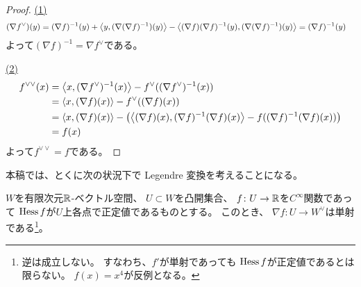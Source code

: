 \documentclass[report]{jlreq}
\begin{document}
\begin{proof}
    \uline{(1)} \quad
    \begin{alignat}{1}
        (\nabla f^\vee)(y)
            &=
                (\nabla f)^{-1}(y)
                + \left\langle{
                    y
                },{
                    (\nabla
                        (\nabla f)^{-1}
                    )(y)
                }\right\rangle
                - \left\langle{
                    (\nabla f)
                    (\nabla f)^{-1}
                    (y)
                },{
                    (\nabla
                        (\nabla f)^{-1}
                    )(y)
                }\right\rangle
            =
                (\nabla f)^{-1}(y)
    \end{alignat}
    よって$(\nabla f)^{-1} = \nabla f^\vee$である。

    \uline{(2)} \quad
    \begin{alignat}{1}
        f^{\vee\vee}(x)
            &=
                \left\langle{
                    x
                },{
                    (\nabla f^\vee)^{-1}
                    (x)
                }\right\rangle
                - f^\vee(
                    (\nabla f^\vee)^{-1}
                    (x)
                )
                \\
            &=
                \left\langle{
                    x
                },{
                    (\nabla f)
                    (x)
                }\right\rangle
                - f^\vee(
                    (\nabla f)
                    (x)
                )
                \\
            &=
                \left\langle{
                    x
                },{
                    (\nabla f)
                    (x)
                }\right\rangle
                - \left({
                    \left\langle{
                        (\nabla f)
                        (x)
                    },{
                        (\nabla f)^{-1}
                        (\nabla f)
                        (x)
                    }\right\rangle
                    - f(
                        (\nabla f)^{-1}
                        (\nabla f)
                        (x)
                    )
                }\right)
                \\
            &=
                f(x)
    \end{alignat}
    よって$f^{\vee\vee} = f$である。
\end{proof}

本稿では、とくに次の状況下で Legendre 変換を考えることになる。

\begin{lemma}
    $W$を有限次元$\mathbb{R}$-ベクトル空間、
    $U \subset W$を凸開集合、
    $f \colon U \to \mathbb{R}$を$C^\infty$関数であって
    $\operatorname{Hess} f$が$U$上各点で正定値であるものとする。
    このとき、
    $\nabla f \colon U \to W^\vee$は単射である\footnote{
        逆は成立しない。
        すなわち、$f'$が単射であっても
        $\operatorname{Hess} f$が正定値であるとは限らない。
        $f(x) = x^4$が反例となる。
    }。
\end{lemma}
\end{document}
